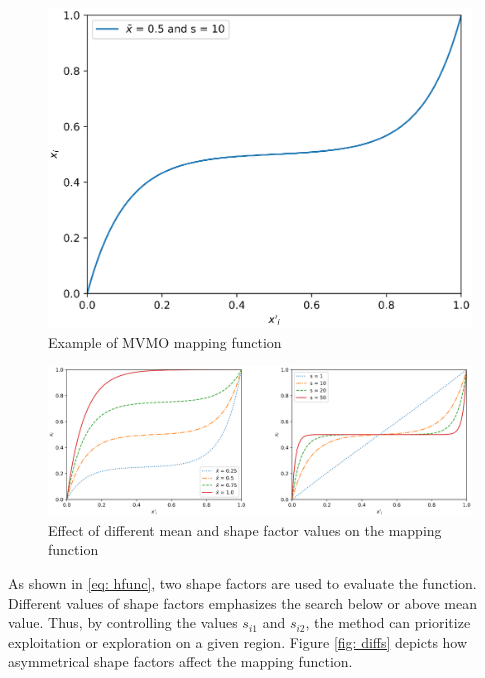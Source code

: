 \begin{figure}[!h]
	\caption{Example of MVMO mapping function}
	\begin{center}
		\includegraphics[scale=.5]{Images/MVMOTransformation.eps}
	\end{center}
	\label{fig: mappingf}
\end{figure}

\begin{figure}[h]
	\caption{Effect of different mean and shape factor values on the mapping function}
	\begin{center}
		\includegraphics[scale=.5]{Images/mean_var_effects.eps}
	\end{center}
	\label{fig: mapeffects}
\end{figure}

As shown in \eqref{eq: hfunc}, two shape factors are used to evaluate the function. Different values of shape factors emphasizes the search below or above mean value. Thus, by controlling the values $s_{i1}$ and $s_{i2}$, the method can prioritize exploitation or exploration on a given region. Figure \ref{fig: diffs} depicts how asymmetrical shape factors affect the mapping function.


